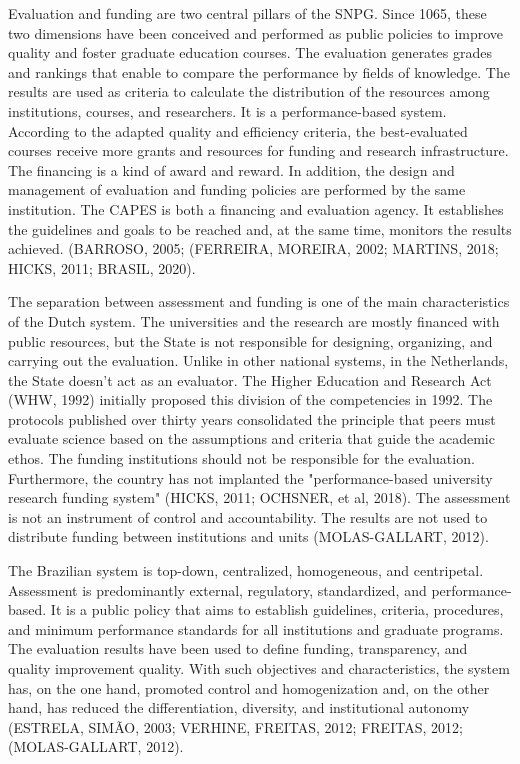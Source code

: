Evaluation and funding are two central pillars of the SNPG. Since 1065, these two dimensions have been conceived and performed as public policies to improve quality and foster graduate education courses. The evaluation generates grades and rankings that enable to compare the performance by fields of knowledge. The results are used as criteria to calculate the distribution of the resources among institutions, courses, and researchers. It is a performance-based system. According to the adapted quality and efficiency criteria, the best-evaluated courses receive more grants and resources for funding and research infrastructure. The financing is a kind of award and reward. In addition, the design and management of evaluation and funding policies are performed by the same institution. The CAPES is both a financing and evaluation agency. It establishes the guidelines and goals to be reached and, at the same time, monitors the results achieved. (BARROSO, 2005; (FERREIRA, MOREIRA, 2002; MARTINS, 2018; HICKS, 2011; BRASIL, 2020). 

The separation between assessment and funding is one of the main characteristics of the Dutch system. The universities and the research are mostly financed with public resources, but the State is not responsible for designing, organizing, and carrying out the evaluation. Unlike in other national systems, in the Netherlands, the State doesn't act as an evaluator. The Higher Education and Research Act (WHW, 1992) initially proposed this division of the competencies in 1992. The protocols published over thirty years consolidated the principle that peers must evaluate science based on the assumptions and criteria that guide the academic ethos. The funding institutions should not be responsible for the evaluation. Furthermore, the country has not implanted the "performance-based university research funding system" (HICKS, 2011; OCHSNER, et al, 2018). The assessment is not an instrument of control and accountability. The results are not used to distribute funding between institutions and units (MOLAS-GALLART, 2012). 


The Brazilian system is top-down, centralized, homogeneous, and centripetal. Assessment is predominantly external, regulatory, standardized, and performance-based. It is a public policy that aims to establish guidelines, criteria, procedures, and minimum performance standards for all institutions and graduate programs. The evaluation results have been used to define funding, transparency, and quality improvement quality. With such objectives and characteristics, the system has, on the one hand, promoted control and homogenization and, on the other hand, has reduced the differentiation, diversity, and institutional autonomy (ESTRELA, SIMÃO, 2003; VERHINE, FREITAS, 2012; FREITAS, 2012; (MOLAS-GALLART, 2012).     

